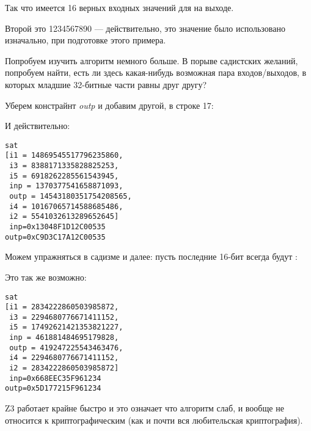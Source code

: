 Так что имеется 16 верных входных значений для  на выходе.

Второй это 1234567890 --- действительно, это значение было использовано изначально,
при подготовке этого примера.

Попробуем изучить алгоритм немного больше.
В порыве садистских желаний, попробуем найти, есть ли здесь какая-нибудь возможная пара входов/выходов,
в которых младшие 32-битные части равны друг другу?

Уберем констрайнт \textit{outp} и добавим другой, в строке 17:



И действительно:

\begin{lstlisting}
sat
[i1 = 14869545517796235860,
 i3 = 8388171335828825253,
 i5 = 6918262285561543945,
 inp = 1370377541658871093,
 outp = 14543180351754208565,
 i4 = 10167065714588685486,
 i2 = 5541032613289652645]
 inp=0x13048F1D12C00535
outp=0xC9D3C17A12C00535
\end{lstlisting}

Можем упражняться в садизме и далее: пусть последние 16-бит всегда будут :



Это так же возможно:

\begin{lstlisting}
sat
[i1 = 2834222860503985872,
 i3 = 2294680776671411152,
 i5 = 17492621421353821227,
 inp = 461881484695179828,
 outp = 419247225543463476,
 i4 = 2294680776671411152,
 i2 = 2834222860503985872]
 inp=0x668EEC35F961234
outp=0x5D177215F961234
\end{lstlisting}

Z3 работает крайне быстро и это означает что алгоритм слаб, и вообще не относится к криптографическим 
(как и почти вся любительская криптография).

